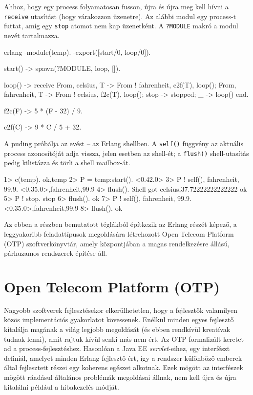 \documentclass[12pt, a4paper, oneside]{book}
\begin{document}
Ahhoz, hogy egy process folyamatosan fusson, újra és újra meg kell hívni a
\texttt{receive} utasítást (hogy várakozzon üzenetre). Az alábbi modul egy
process-t futtat, amíg egy \texttt{stop} atomot nem kap üzenetként. A
\texttt{?MODULE} makró a modul nevét tartalmazza.

\begin{code}{erlang}{}
-module(temp).
-export([start/0, loop/0]).

start() ->
  spawn(?MODULE, loop, []).

loop() ->
  receive
    {From, celsius, T} ->
        From ! {fahrenheit, c2f(T)},
        loop();
    {From, fahrenheit, T} ->
        From ! {celsius, f2c(T)},
        loop();
    stop ->
      stopped;
    _ ->
      loop()
  end.

f2c(F) ->
  5 * (F - 32) / 9.

c2f(C) ->
  9 * C / 5 + 32.
\end{code}

A puding próbálja az evést -- az Erlang shellben. A \texttt{self()} függvény az
aktuális process azonosítóját adja vissza, jelen esetben az shell-ét; a
\texttt{flush()} shell-utasítás pedig kilistázza és törli a shell mailbox-át.

\begin{code}{}{}
1> c(temp).
{ok,temp}
2> P = temp:start().
<0.42.0>
3> P ! {self(), fahrenheit, 99.9}.
{<0.35.0>,fahrenheit,99.9}
4> flush().
Shell got {celsius,37.72222222222222}
ok
5> P ! stop.                      
stop
6> flush(). 
ok
7> P ! {self(), fahrenheit, 99.9}.
{<0.35.0>,fahrenheit,99.9}
8> flush().                       
ok
\end{code}

Az ebben a részben bemutatott téglákból építkezik az Erlang részét képező,
a leggyakoribb feladattípusok megoldására létrehozott Open Telecom Platform 
(OTP) szoftverkönyvtár, amely központjában a magas rendelkezésre állású,
párhuzamos rendszerek építése áll.

\section{Open Telecom Platform (OTP)} Nagyobb szoftverek fejlesztésekor
elkerülhetetlen, hogy a fejlesztők valamilyen közös implementációs gyakorlatot
kövessenek. Enélkül minden egyes fejlesztő kitalálja magának a világ legjobb
megoldását (és ebben rendkívül kreatívak tudnak lenni), amit rajtuk kívül senki
más nem ért. Az OTP formalizált keretet ad a process-fejlesztéshez. Hasonlóan a
Java EE \emph{servlet}-eihez, egy interfészt definiál, amelyet minden Erlang
fejlesztő ért, így a rendszer különböző emberek által fejlesztett részei egy
koherens egészet alkotnak. Ezek mögött az interfészek mögött ráadásul általános
problémák megoldásai állnak, nem kell újra és újra kitalálni például a
hibakezelés módját.
\end{document}
